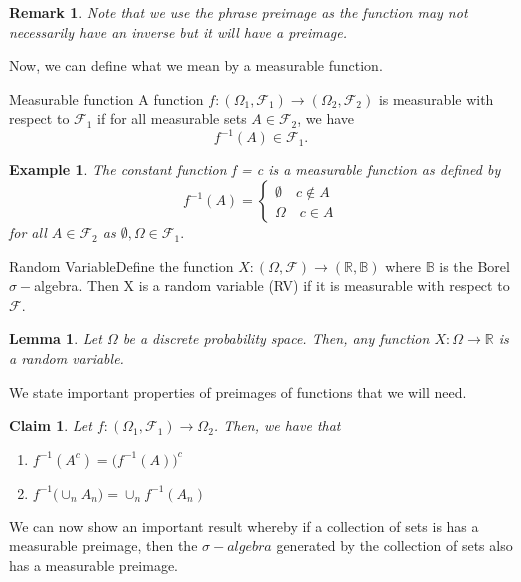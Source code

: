 \documentclass[twoside]{article}
\newtheorem{lemma}[theorem]{Lemma}
\newtheorem{claim}[theorem]{Claim}
\newtheorem{remark}[theorem]{Remark}
\newtheorem{example}[theorem]{Example}
\newcommand{\sigmalgebra}{\mathcal{F}}
\newcommand{\sa}{\sigma-algebra}
\begin{document}
\begin{remark} Note that we use the phrase preimage as the function may not necessarily have an inverse but it will have a preimage.
\end{remark}

Now, we can define what we mean by a measurable function.

\begin{definition_exam}{Measurable function}{} A function $f: (\Omega_1,\sigmalgebra_1) \rightarrow (\Omega_2,\sigmalgebra_2)$ is measurable with respect to $\sigmalgebra_1$ if for all measurable sets $A \in \sigmalgebra_2$, we have $$f^{-1}(A) \in \sigmalgebra_1.$$
\end{definition_exam}

\begin{example}The constant function f = c is a measurable function as defined by 
$$
f^{-1}(A) = 
\begin{cases}
\emptyset \quad c \not \in A\\
\Omega \quad c \in A
\end{cases}
$$
for all $A \in \sigmalgebra_2$ as $\emptyset, \Omega \in \sigmalgebra_1.$
\end{example}


\begin{definition_exam}{Random Variable}{}Define the function $X: (\Omega, \sigmalgebra) \rightarrow (\mathbb{R}, \mathbb{B})$ where $\mathbb{B}$ is the Borel $\sigma-$algebra. Then X is a random variable (RV) if it is measurable with respect to $\sigmalgebra$.
\end{definition_exam}

\begin{lemma}Let $\Omega$ be a discrete probability space. Then, any function $X: \Omega \rightarrow \mathbb{R}$ is a random variable.
\end{lemma}

We state important properties of preimages of functions that we will need.
\begin{claim} Let $f:(\Omega_1, \sigmalgebra_1) \rightarrow \Omega_2$. Then, we have that 
\begin{enumerate}
\item $f^{-1}(A^c) = \bigg(f^{-1}(A) \bigg)^c$
\item $f^{-1}\big(\cup_nA_n \big) = \cup_n f^{-1}(A_n)$
\end{enumerate}
\end{claim}

We can now show an important result whereby if a collection of sets is has a measurable preimage, then the $\sa$ generated by the collection of sets also has a measurable preimage.
\end{document}
